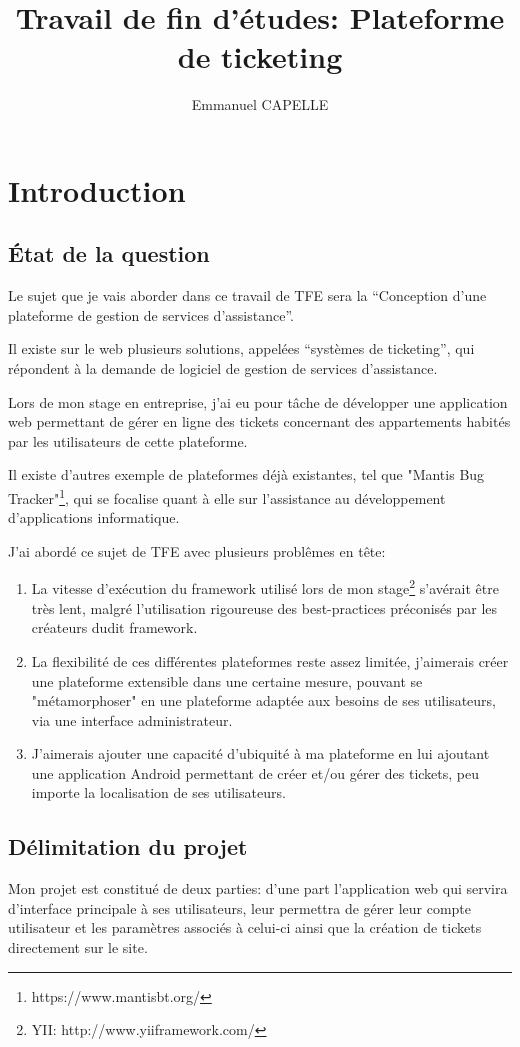 \documentclass[12pt,table,a4paper]{report}
\title{Travail de fin d'études: Plateforme de ticketing}
\author{Emmanuel CAPELLE}
\date{}
\begin{document}
\tableofcontents

\newpage

\chapter{Introduction}

\section{État de la question}
Le sujet que je vais aborder dans ce travail de TFE sera la “Conception d’une plateforme de gestion de services d’assistance”.

Il existe sur le web plusieurs solutions, appelées “systèmes de ticketing”, qui répondent à la demande de logiciel de gestion de services d’assistance.

Lors de mon stage en entreprise, j’ai eu pour tâche de développer une application web permettant de gérer en ligne des tickets concernant des appartements habités par les utilisateurs de cette plateforme.

Il existe d’autres exemple de plateformes déjà existantes, tel que "Mantis Bug Tracker"\footnote{https://www.mantisbt.org/}, qui se focalise quant à elle sur l’assistance au développement d’applications informatique.

J’ai abordé ce sujet de TFE avec plusieurs problêmes en tête:
\begin{enumerate}
\item{La vitesse d’exécution du framework utilisé lors de mon stage\footnote{YII: http://www.yiiframework.com/} s’avérait être très lent, malgré l’utilisation rigoureuse des best-practices préconisés par les créateurs dudit framework.}
\item{La flexibilité de ces différentes plateformes reste assez limitée, j’aimerais créer une plateforme extensible dans une certaine mesure, pouvant se "métamorphoser" en une plateforme adaptée aux besoins de ses utilisateurs, via une interface administrateur.}
\item{J’aimerais ajouter une capacité d’ubiquité à ma plateforme en lui ajoutant une application Android permettant de créer et/ou gérer des tickets, peu importe la localisation de ses utilisateurs.}
\end{enumerate}


\section{Délimitation du projet}
Mon projet est constitué de deux parties: d'une part l'application web qui servira d'interface principale à ses utilisateurs, leur permettra de gérer leur compte utilisateur et les paramètres associés à celui-ci ainsi que la création de tickets directement sur le site.
\end{document}
